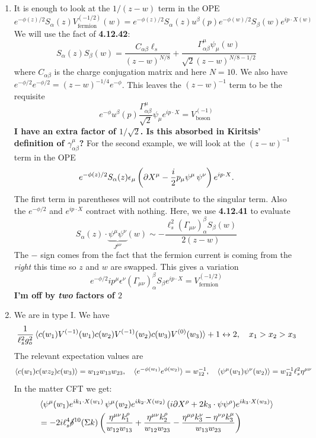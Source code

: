 \documentclass[11pt, class=article, crop=false]{standalone}
\begin{document}
\begin{enumerate}
	\item It is enough to look at the $1/(z-w)$ term in the OPE
	\[
		e^{-\phi(z)/2} S_\alpha(z) V^{(-1/2)}_{\text{fermion}}(w) = e^{-\phi(z)/2} S_\alpha(z) u^\beta(p) e^{-\phi(w)/2} S_\beta(w) e^{i p \cdot X(w)}
	\]
	We will use the fact of \textbf{4.12.42}:
	\[
		S_\alpha(z) S_\beta(w) = \frac{C_{\alpha \beta} \ell_s}{(z-w)^{N/8}} + \frac{\Gamma^\mu_{\alpha \beta} \psi_\mu(w)}{\sqrt 2 (z-w)^{N/8-1/2}}
	\]
	where $C_{\alpha \beta}$ is the charge conjugation matrix and here $N=10$. We also have $e^{-\phi/2} e^{-\phi/2} = (z-w)^{-1/4} e^{-\phi}$. This leaves the $(z-w)^{-1}$ term to be the requisite  
	\[
		e^{-\phi} u^\beta(p) \frac{\Gamma^\mu_{\alpha \beta}}{\sqrt 2} \psi_\mu e^{i p \cdot X} = V^{(-1)}_{\text{boson}}	
	\] 
	\textbf{I have an extra factor of $1/\sqrt 2$. Is this absorbed in Kiritsis' definition of $\gamma^\mu_{\alpha \beta}$? }
	For the second example, we will look at the $(z-w)^{-1}$ term in the OPE
	\[
		e^{-\phi(z)/2} S_\alpha(z) \epsilon_\mu \left(\partial X^\mu- \frac i2 p_\mu \psi^\mu\, \psi^\nu \right) e^{i p \cdot X}.
	\]
	The first term in parentheses will not contribute to the singular term. Also the $e^{-\phi/2}$ and $e^{i p \cdot X}$ contract with nothing. Here, we use \textbf{4.12.41} to evaluate
	\[
		 S_\alpha(z) \cdot \underbrace{\psi^\mu \psi^\nu}_{J^{\mu \nu}} (w) \sim - \frac{\ell_s^2 (\Gamma_{\mu \nu})^\beta_\alpha S_\beta (w)}{2 (z-w)}
	\]
	The $-$ sign comes from the fact that the fermion current is coming from the \emph{right} this time so $z$ and $w$ are swapped.  
	This gives a variation
	\[
		e^{-\phi/2} i p^\mu \epsilon^\nu (\Gamma_{\mu \nu})^{\beta}_{\alpha} S_\beta e^{i p \cdot X} = V^{(-1/2)}_{\text{fermion}}
	\]
	\textbf{I'm off by \emph{two} factors of $2$ }
	
	\item We are in type I. We have 
	\[
		\frac{1}{\ell_s^2 g_o^2} \braket{c(w_1) V^{(-1)} (w_1) c(w_2)  V^{(-1)} (w_2) c(w_3)  V^{(0)} (w_3) } + 1 \leftrightarrow 2, \quad x_1 > x_2 > x_3
	\]
	The relevant expectation values are
	\[
		\braket{c(w_1) c(wz_2) c(w_3)} = w_{12} w_{13} w_{23}, \quad \braket{e^{-\phi(w_1)} e^{\phi(w_2)}} = w_{12}^{-1}, \quad \braket{\psi^\mu(w_1) \psi^\nu (w_2)} = w_{12}^{-1} \ell_s^2 \eta^{\mu \nu}
	\]
	In the matter CFT we get:
	\[
	\begin{aligned}
		&\braket{\psi^\mu (w_1) e^{i k_1 \cdot X(w_1)}\, \psi^\mu (w_2) e^{i k_2 \cdot X(w_2)} \, (i \partial X^\rho + 2 k_3 \cdot \psi \psi^\rho) e^{i k_3 \cdot X(w_3)} } \\
		&= - 2 i \ell_s^4 \cancel\delta^{10}(\Sigma k) \left(\frac{\eta^{\mu \nu}k_1^\rho}{w_{12} w_{13}} + \frac{\eta^{\mu \nu} k_2^\rho}{w_{12} w_{23}} - \frac{\eta^{\mu \rho} k_3^\nu - \eta^{\nu \rho} k_3^\mu}{w_{13} w_{23}} \right)
	\end{aligned}
	\]
	

\end{enumerate}
\end{document}
